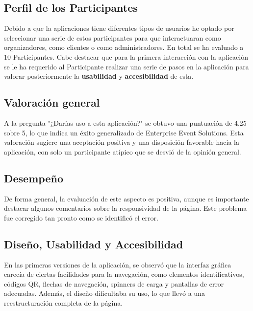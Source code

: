 \subsection{Perfil de los Participantes}

Debido a que la aplicaciones tiene diferentes tipos de usuarios he optado por seleccionar una serie de estos participantes para que interactuaran como organizadores,
como clientes o como administradores. En total se ha evaluado a 10 Participantes.
Cabe destacar que para la primera interacción con la aplicación se le ha requerido al Participante realizar una serie de pasos en la aplicación para 
valorar posteriormente la \textbf{usabilidad} y \textbf{accesibilidad} de esta.

\subsection{Valoración general}
A la pregunta "¿Darías uso a esta aplicación?" se obtuvo una puntuación de 4.25 sobre 5, lo que indica un éxito generalizado de Enterprise Event Solutions.
Esta valoración sugiere una aceptación positiva y una disposición favorable hacia la aplicación, con solo un participante atípico que se desvió de la opinión
general.

\subsection{Desempeño}

De forma general, la evaluación de este aspecto es positiva, aunque es importante destacar algunos comentarios sobre la responsividad de la página. Este problema
fue corregido tan pronto como se identificó el error.

\subsection{Diseño, Usabilidad y Accesibilidad}
En las primeras versiones de la aplicación, se observó que la interfaz gráfica carecía de ciertas facilidades para la navegación, como elementos
identificativos, códigos QR, flechas de navegación, spinners de carga y pantallas de error adecuadas. Además, el diseño dificultaba su uso, lo que llevó a una reestructuración completa de la página.

